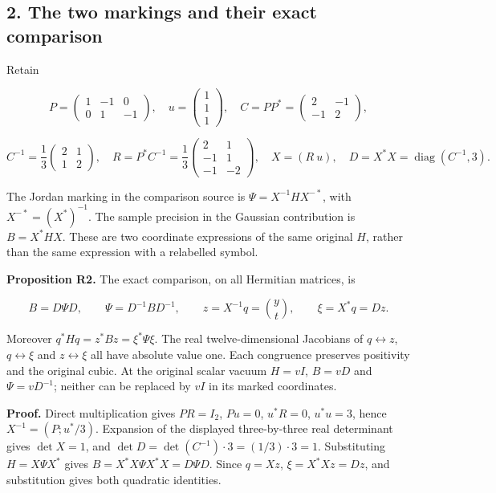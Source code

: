 \documentclass[
  11pt,
]{article}
\begin{document}
\subsection{2. The two markings and their exact
comparison}\label{the-two-markings-and-their-exact-comparison}

Retain

\[
P=\begin{pmatrix}1&-1&0\\0&1&-1\end{pmatrix},\quad
u=\begin{pmatrix}1\\1\\1\end{pmatrix},\quad
C=PP^*=\begin{pmatrix}2&-1\\-1&2\end{pmatrix},
\]

\[
C^{-1}=\frac13\begin{pmatrix}2&1\\1&2\end{pmatrix},\quad
R=P^*C^{-1}=\frac13\begin{pmatrix}2&1\\-1&1\\-1&-2\end{pmatrix},\quad
X=(R\ u),\quad D=X^*X=\operatorname{diag}(C^{-1},3).
\]

The Jordan marking in the comparison source is \(\Psi=X^{-1}HX^{-*}\),
with \(X^{-*}=(X^*)^{-1}\). The sample precision in the Gaussian
contribution is \(B=X^*HX\). These are two coordinate expressions of the
same original \(H\), rather than the same expression with a relabelled
symbol.

\textbf{Proposition R2.} The exact comparison, on all Hermitian
matrices, is

\[
B=D\Psi D,\qquad \Psi=D^{-1}BD^{-1},\qquad
z=X^{-1}q=\binom yt,\qquad \xi=X^*q=Dz.
\]

Moreover \(q^*Hq=z^*Bz=\xi^*\Psi\xi\). The real twelve-dimensional
Jacobians of \(q\leftrightarrow z\), \(q\leftrightarrow\xi\) and
\(z\leftrightarrow\xi\) all have absolute value one. Each congruence
preserves positivity and the original cubic. At the original scalar
vacuum \(H=vI\), \(B=vD\) and \(\Psi=vD^{-1}\); neither can be replaced
by \(vI\) in its marked coordinates.

\textbf{Proof.} Direct multiplication gives \(PR=I_2\), \(Pu=0\),
\(u^*R=0\), \(u^*u=3\), hence \(X^{-1}=(P;u^*/3)\). Expansion of the
displayed three-by-three real determinant gives \(\det X=1\), and
\(\det D=\det(C^{-1})\cdot3=(1/3)\cdot3=1\). Substituting
\(H=X\Psi X^*\) gives \(B=X^*X\Psi X^*X=D\Psi D\). Since \(q=Xz\),
\(\xi=X^*Xz=Dz\), and substitution gives both quadratic identities.
\end{document}
